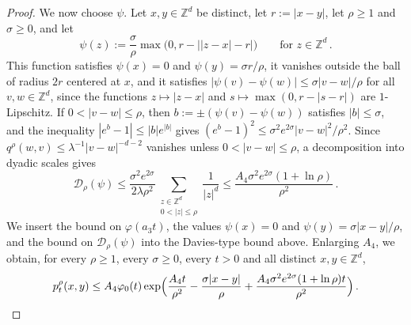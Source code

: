 \documentclass[11pt]{amsart}
\numberwithin{equation}{section}
\newcommand{\Z}{\mathbb{Z}}
\begin{document}
\begin{proof}
We now choose $\psi$.
Let $x, y \in \Z^d$ be distinct, let $r := |x - y|$, let $\rho \geq 1$ and $\sigma \geq 0$, and let
\begin{equation*}
    \psi(z) := \frac{\sigma}{\rho} \max \bigl( 0, r - \bigl| |z - x| - r \bigr| \bigr) \qquad \text{for } z \in \Z^d\,.
\end{equation*}
This function satisfies $\psi(x) = 0$ and $\psi(y) = \sigma r / \rho$, it vanishes outside the ball of radius $2r$ centered at $x$, and it satisfies $|\psi(v) - \psi(w)| \leq \sigma |v - w| / \rho$ for all $v, w \in \Z^d$, since the functions $z \mapsto |z - x|$ and $s \mapsto \max(0, r - |s - r|)$ are $1$-Lipschitz.
If $0 < |v - w| \leq \rho$, then $b := \pm (\psi(v) - \psi(w))$ satisfies $|b| \leq \sigma$, and the inequality $|e^b - 1| \leq |b| e^{|b|}$ gives $(e^b - 1)^2 \leq \sigma^2 e^{2 \sigma} |v - w|^2 / \rho^2$.
Since $q^\rho(w, v) \leq \lambda^{-1} |v - w|^{-d-2}$ vanishes unless $0 < |v - w| \leq \rho$, a decomposition into dyadic scales gives
\begin{equation*}
    \mathcal{D}_\rho(\psi) \leq \frac{\sigma^2 e^{2 \sigma}}{2 \lambda \rho^2} \sum_{\substack{z \in \Z^d \\ 0 < |z| \leq \rho}} \frac{1}{|z|^d} \leq \frac{A_4 \sigma^2 e^{2 \sigma} (1 + \ln \rho)}{\rho^2}\,.
\end{equation*}
We insert the bound on $\varphi(a_3 t)$, the values $\psi(x) = 0$ and $\psi(y) = \sigma |x - y| / \rho$, and the bound on $\mathcal{D}_\rho(\psi)$ into the Davies-type bound above.
Enlarging $A_4$, we obtain, for every $\rho \geq 1$, every $\sigma \geq 0$, every $t > 0$ and all distinct $x, y \in \Z^d$,
\begin{equation*}
    p^\rho_t(x,y) \leq A_4 \varphi_0(t) \exp \Bigl( \frac{A_4 t}{\rho^2} - \frac{\sigma |x - y|}{\rho} + \frac{A_4 \sigma^2 e^{2 \sigma} (1 + \ln \rho) t}{\rho^2} \Bigr)\,.
\end{equation*}


\end{proof}
\end{document}

